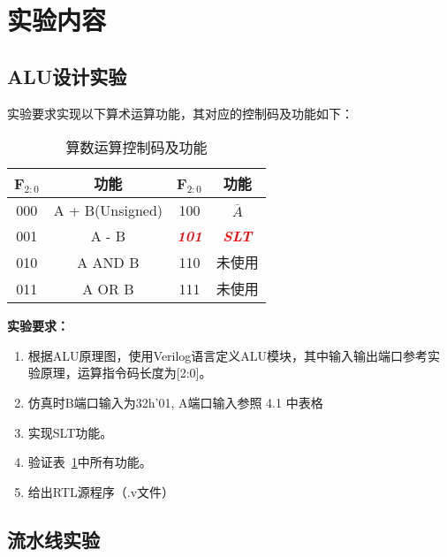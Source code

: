 \section{实验内容}
\subsection{ALU设计实验}
实验要求实现以下算术运算功能，其对应的控制码及功能如下：
\begin{table}[htbp]
    \centering
    \begin{tabular}{cccc}
        \hline
         F$_{2:0}$ & 功能 & F$_{2:0}$ & 功能  \\
         \hline
         000 & A + B(Unsigned) & 100 & $\overline{A}$ \\
         001 & A - B & \textcolor{red}{\textit{\textbf{101}}} & \textcolor{red}{\textit{\textbf{SLT}}}\\
         010 & A AND B & 110 & 未使用\\
         011 & A OR B  & 111 & 未使用\\
         \hline
    \end{tabular}
    \caption{算数运算控制码及功能}
    \label{tab:opcode}
\end{table}

\textbf{实验要求：}
\begin{enumerate}
    \item 根据ALU原理图，使用Verilog语言定义ALU模块，其中输入输出端口参考实验原理，运算指令码长度为[2:0]。
    \item 仿真时B端口输入为32h'01, A端口输入参照 4.1 中表格
    \item 实现SLT功能。
    \item 验证表~\ref{tab:opcode}中所有功能。
    \item 给出RTL源程序（.v文件）

\end{enumerate}

\subsection{流水线实验}

